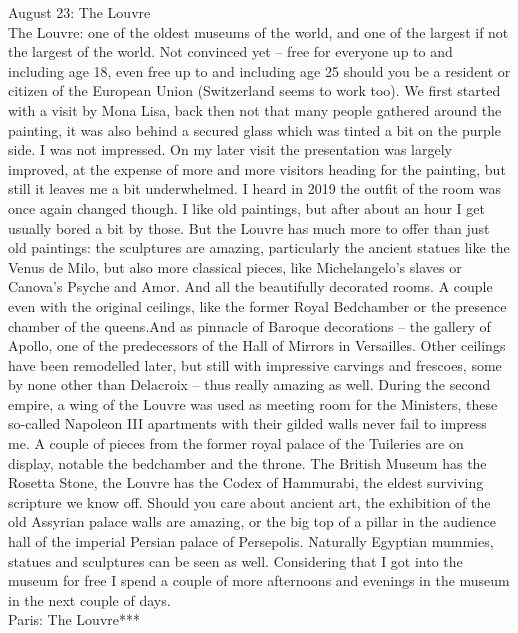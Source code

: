 August 23: The Louvre\\
The Louvre: one of the oldest museums of the world, and one of the largest if not the largest of the world. Not convinced yet -- free for everyone up to and including age 18, even free up to and including age 25 should you be a resident or citizen of the European Union (Switzerland seems to work too). We first started with a visit by Mona Lisa, back then not that many people gathered around the painting, it was also behind a secured glass which was tinted a bit on the purple side. I was not impressed. On my later visit the presentation was largely improved, at the expense of more and more visitors heading for the painting, but still it leaves me a bit underwhelmed. I heard in 2019 the outfit of the room was once again changed though. I like old paintings, but after about an hour I get usually bored a bit by those. But the Louvre has much more to offer than just old paintings: the sculptures are amazing, particularly the ancient statues like the Venus de Milo, but also more classical pieces, like Michelangelo's slaves or Canova's Psyche and Amor. And all the beautifully decorated rooms. A couple even with the original ceilings, like the former Royal Bedchamber or the presence chamber of the queens.And as pinnacle of Baroque decorations -- the gallery of Apollo, one of the predecessors of the Hall of Mirrors in Versailles. Other ceilings have been remodelled later, but still with impressive carvings and frescoes, some by none other than Delacroix -- thus really amazing as well. During the second empire, a wing of the Louvre was used as meeting room for the Ministers, these so-called Napoleon III apartments with their gilded walls never fail to impress me. A couple of pieces from the former royal palace of the Tuileries are on display, notable the bedchamber and the throne. The British Museum has the Rosetta Stone, the Louvre has the Codex of Hammurabi, the eldest surviving scripture we know off. Should you care about ancient art, the exhibition of the old Assyrian palace walls are amazing, or the big top of a pillar in the audience hall of the imperial Persian palace of Persepolis. Naturally Egyptian mummies, statues and sculptures can be seen as well. Considering that I got into the museum for free I spend a couple of more afternoons and evenings in the museum in the next couple of days.\\

Paris: The Louvre***\\

